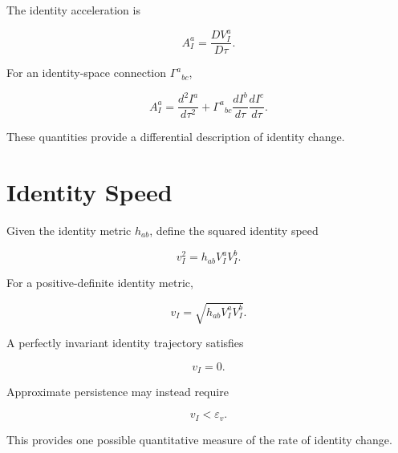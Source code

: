 \documentclass[12pt,oneside]{book}
\begin{document}
The identity acceleration is

\begin{equation}
    A_I^a
    =
    \frac{D V_I^a}{D\tau}.
    \label{eq:sefi-identity-acceleration}
\end{equation}

For an identity-space connection
\(\Gamma^a{}_{bc}\),

\begin{equation}
    A_I^a
    =
    \frac{d^2I^a}{d\tau^2}
    +
    \Gamma^a{}_{bc}
    \frac{dI^b}{d\tau}
    \frac{dI^c}{d\tau}.
    \label{eq:identity-acceleration-expanded}
\end{equation}

These quantities provide a differential description of identity
change.


\section{Identity Speed}
\label{sec:identity-speed}

Given the identity metric \(h_{ab}\), define the squared identity
speed

\begin{equation}
    v_I^2
    =
    h_{ab}
    V_I^a V_I^b.
    \label{eq:identity-speed-squared}
\end{equation}

For a positive-definite identity metric,

\begin{equation}
    v_I
    =
    \sqrt{
        h_{ab}
        V_I^a V_I^b
    }.
    \label{eq:identity-speed}
\end{equation}

A perfectly invariant identity trajectory satisfies

\begin{equation}
    v_I
    =
    0.
    \label{eq:zero-identity-speed}
\end{equation}

Approximate persistence may instead require

\begin{equation}
    v_I
    <
    \varepsilon_v.
    \label{eq:bounded-identity-speed}
\end{equation}

This provides one possible quantitative measure of the rate of
identity change.
\end{document}
